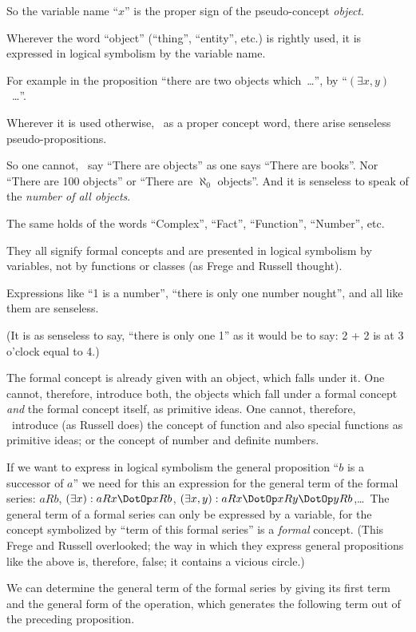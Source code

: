 {So the variable name ``$x$'' is the proper sign of
the pseudo-concept \emph{object}.

Wherever the word ``object'' (``thing'', ``entity'',
etc.) is rightly used, it is expressed in logical
symbolism by the variable name.

For example in the proposition ``there are two
objects which\ \ldots'', by ``$(\exists x,y)$\ \ldots''.

Wherever it is used otherwise, \idEst\ as a proper
concept word, there arise senseless pseudo-propositions.

So one cannot, \exempliGratia\ say ``There are objects''
as one says ``There are books''. Nor ``There
are 100 objects'' or ``There are $\aleph_0$ objects''. And
it is senseless to speak of the \emph{number of all
objects}.

The same holds of the words ``Complex'',
``Fact'', ``Function'', ``Number'', etc.

They all signify formal concepts and are
presented in logical symbolism by variables, not
by functions or classes (as Frege and Russell
thought).

Expressions like ``1 is a number'', ``there is
only one number nought'', and all like them are
senseless.

(It is as senseless to say, ``there is only one 1''
as it would be to say: 2 + 2 is at 3 o'clock equal
to 4.)}


{The formal concept is already given with an
object, which falls under it. One cannot, therefore,
introduce both, the objects which fall under
a formal concept \emph{and} the formal concept itself,
as primitive ideas. One cannot, therefore, \exempliGratia\ introduce
(as Russell does) the concept of function
and also special functions as primitive ideas; or
the concept of number and definite numbers.}


{If we want to express in logical symbolism
the general proposition ``$b$ is a successor of $a$''
we need for this an expression for the general
term of the formal series: $aRb$, $(\exists x) : aRx \DotOp xRb$,
$(\exists x,y) : aRx \DotOp xRy \DotOp yRb$,\;\ldots\ The general term of
a formal series can only be expressed by a
variable, for the concept symbolized by ``term of
this formal series'' is a \emph{formal} concept. (This
Frege and Russell overlooked; the way in
which they express general propositions like the
above is, therefore, false; it contains a vicious
circle.)

We can determine the general term of the
formal series by giving its first term and the
general form of the operation, which generates
the following term out of the preceding proposition.}


